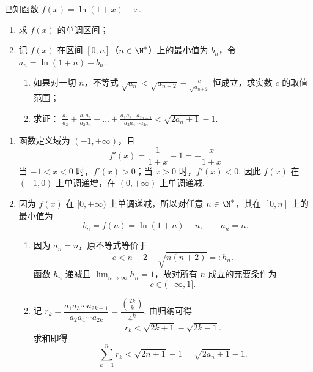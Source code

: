 \begin{problem}
已知函数 \( f(x) = \ln (1 + x) - x \).
\begin{enumerate}
\item 求 \( f(x) \) 的单调区间；
\item 记 \( f(x) \) 在区间 \([0,n]\)（\(n \in \N^*\)）上的最小值为 \(b_n\)，令 \(a_n = \ln(1 + n) - b_n\).
\begin{enumerate}
    \item 如果对一切 \(n\)，不等式 \( \sqrt{a_n} < \sqrt{a_{n+2}} - \frac{c}{\sqrt{a_{n+2}}} \) 恒成立，求实数 \(c\) 的取值范围；
    \item 求证： \(\frac{a_1}{a_2} + \frac{a_1a_3}{a_2a_4} + \dots + \frac{a_1a_3\cdots a_{2n-1}}{a_2a_4\cdots a_{2n}} < \sqrt{2a_n + 1} -1\).
\end{enumerate}
\end{enumerate}
\end{problem}

\begin{solution}
\begin{enumerate}
\item 函数定义域为 \((-1,+\infty)\)，且
\[
f'(x)=\frac{1}{1+x}-1=-\frac{x}{1+x}
\]
当 \(-1<x<0\) 时，\(f'(x)>0\)；当 \(x>0\) 时，\(f'(x)<0\). 因此 \(f(x)\) 在 \((-1,0)\) 上单调递增，在 \((0,+\infty)\) 上单调递减.

\item 因为 \(f(x)\) 在 \([0,+\infty)\) 上单调递减，所以对任意 \(n\in\N^*\)，其在 \([0,n]\) 上的最小值为
\[
b_n=f(n)=\ln(1+n)-n,
\qquad a_n=n.
\]

\begin{enumerate}
\item 因为 \(a_n=n\)，原不等式等价于
\[
c<n+2-\sqrt{n(n+2)}=:h_n.
\]
函数 \(h_n\) 递减且 \(\lim_{n\to\infty}h_n=1\)，故对所有 \(n\) 成立的充要条件为
\[
c\in(-\infty,1].
\]

\item 记 \(r_k=\dfrac{a_1a_3\cdots a_{2k-1}}{a_2a_4\cdots a_{2k}}=\dfrac{\binom{2k}{k}}{4^k}\). 由归纳可得
\[
r_k<\sqrt{2k+1}-\sqrt{2k-1}.
\]
求和即得
\[
\sum_{k=1}^{n}r_k<\sqrt{2n+1}-1=\sqrt{2a_n+1}-1.
\]
\end{enumerate}
\end{enumerate}
\end{solution}
